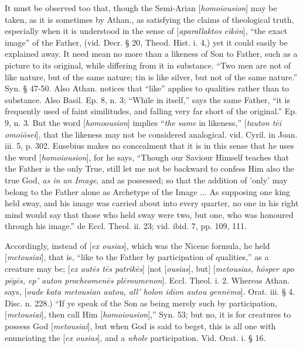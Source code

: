 It must be observed too that, though the
Semi-Arian [\emph{homoiousion}] may be taken, as it is sometimes by
Athan., as satisfying the claims of theological truth, especially when
it is understood in the sense of [\emph{aparallaktos eik\={o}n}], ``the
exact image'' of the Father, (vid. Decr. § 20, Theod. Hist. i. 4,) yet
it could easily be explained away. It need mean no more than a
likeness of Son to Father, such as a picture to its original, while
differing from it in substance. ``Two
men are not of like nature, but of the same nature; tin is like
silver, but not of the same nature.'' Syn. § 47-50. Also Athan.
notices that ``like''
applies to qualities rather than to substance. Also Basil. Ep. 8, n.
3; ``While in itself,''
says the same Father, ``it
is frequently used of faint similitudes, and falling very far short of
the original.'' Ep. 9, n. 3. But the word [\emph{homoousion}] implies ``\emph{the
same} in likeness,'' [\emph{tauton t\={e}i omoi\={o}sei}],
that the likeness may not be considered analogical. vid. Cyril. in
Joan. iii. 5, p. 302. Eusebius makes no concealment that it is in this
sense that he uses the word [\emph{homoiousion}], for he says, ``Though
our Saviour Himself teaches that the Father is the only True, still
let me not be backward to confess Him also the true God, \emph{as in an
Image}, and as
possessed; so that the addition of 'only' may belong to the Father
alone as Archetype of the Image ... As supposing one king held sway,
and his image was carried about into every quarter, no one in his
right mind would say that those who held sway were two, but one,
who was honoured through his image.'' de Eccl. Theol. ii. 23; vid.
ibid. 7, pp. 109, 111.

Accordingly, instead of [\emph{ex ousias}], which
was the Nicene formula, he held [\emph{metousiai}], that is, ``like to
the Father by participation of qualities,'' as a creature may be; [\emph{ex
aut\={e}s t\={e}s patrik\={e}s}] [not [\emph{ousias}],
but] [\emph{metousias, h\={o}sper apo p\={e}g\={e}s, ep'
auton procheomen\={e}s pl\={e}roumenon}]. Eccl. Theol.
i. 2. Whereas Athan. says, [\emph{oude kata metousian autou, all'
holon idion autou genn\={e}ma}]. Orat. iii. § 4. Disc.
n. 228.) ``If ye speak of the Son as being merely such by
participation, [\emph{metousiai}], then call Him [\emph{homoiousion}],''
Syn. 53; but no, it is for creatures to possess God [\emph{metousiai}],
but when God is said to beget, this is all one with enunciating the [\emph{ex
ousias}], and a \emph{whole} participation. Vid. Orat. i. § 16.

